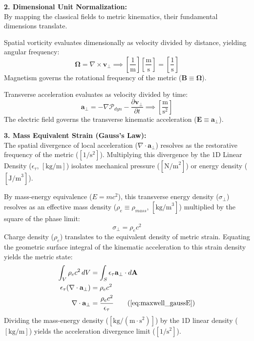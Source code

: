 \vspace{0.2 cm}

\textbf{2. Dimensional Unit Normalization:} \\
By mapping the classical fields to metric kinematics, their fundamental dimensions translate. 

Spatial vorticity evaluates dimensionally as velocity divided by distance, yielding angular frequency:
\begin{equation}
    \boldsymbol{\Omega} = \nabla \times \mathbf{v}_{\perp} \implies \left[\frac{1}{\text{m}}\right] \left[\frac{\text{m}}{\text{s}}\right] = \left[\frac{1}{\text{s}}\right] \label{eq:b_frequency}
\end{equation}
Magnetism governs the rotational frequency of the metric ($\mathbf{B} \equiv \boldsymbol{\Omega}$). 

Transverse acceleration evaluates as velocity divided by time:
\begin{equation}
    \mathbf{a}_\perp = -\nabla \mathcal{P}_{dyn} - \frac{\partial \mathbf{v}_{\perp}}{\partial t} \implies \left[\frac{\text{m}}{\text{s}^2}\right] \label{eq:e_acceleration}
\end{equation}
The electric field governs the transverse kinematic acceleration ($\mathbf{E} \equiv \mathbf{a}_\perp$). 

\vspace{0.2 cm}

\textbf{3. Mass Equivalent Strain (Gauss's Law):} \\
The spatial divergence of local acceleration ($\nabla \cdot \mathbf{a}_\perp$) resolves as the restorative frequency of the metric ($[1/\text{s}^2]$). Multiplying this divergence by the 1D Linear Density ($\epsilon_{\tau}$, $[\text{kg/m}]$) isolates mechanical pressure ($[\text{N/m}^2]$) or energy density ($[\text{J/m}^3]$). 

By mass-energy equivalence ($E = mc^2$), this transverse energy density ($\sigma_\perp$) resolves as an effective mass density ($\rho_e \equiv \rho_{mass}$, $[\text{kg/m}^3]$) multiplied by the square of the phase limit:
\begin{equation}
    \sigma_\perp = \rho_e c^2 \nonumber
\end{equation}
Charge density ($\rho_e$) translates to the equivalent density of metric strain. Equating the geometric surface integral of the kinematic acceleration to this strain density yields the metric state:
\begin{align}
    \int_V \rho_e c^2 \, dV &= \int_S \epsilon_{\tau} \mathbf{a}_\perp \cdot d\mathbf{A} \nonumber \\
    \epsilon_\tau (\nabla \cdot \mathbf{a}_\perp) &= \rho_e c^2 \nonumber \\
    \nabla \cdot \mathbf{a}_\perp &= \frac{\rho_e c^2}{\epsilon_{\tau}} \tag{\ref{eq:maxwell_gaussE}}
\end{align}
Dividing the mass-energy density ($[\text{kg}/(\text{m}\cdot\text{s}^2)]$) by the 1D linear density ($[\text{kg/m}]$) yields the acceleration divergence limit ($[1/\text{s}^2]$).

